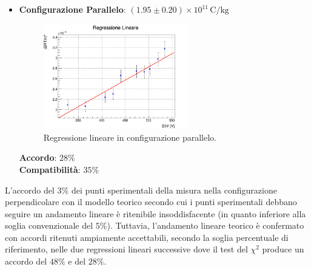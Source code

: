 \documentclass[a4paper,12pt]{article}
\begin{document}
\begin{itemize}
    \item \textbf{Configurazione Parallelo}: \( (1.95 \pm 0.20) \times 10^{11} \, \text{C/kg}\)
    \begin{figure}[H]
        \centering
        \includegraphics[width=0.6\textwidth]{regr_parallelo.png}
        \caption{Regressione lineare in configurazione parallelo.}
        \label{fig:regr_parallelo}
    \end{figure}
    \textbf{Accordo}: \(28\%\) \\
    \textbf{Compatibilità}: \(35\%\)
\end{itemize}
L’accordo del \(3\%\) dei punti sperimentali della misura nella configurazione perpendicolare con il modello teorico secondo cui i punti sperimentali debbano seguire un andamento lineare è ritenibile insoddisfacente (in quanto inferiore alla soglia convenzionale del \(5\%\)). Tuttavia, l’andamento lineare teorico è confermato con accordi ritenuti ampiamente accettabili, secondo la soglia percentuale di riferimento, nelle due regressioni lineari successive dove il test del \( \chi^2 \) produce un accordo del \(48\%\) e del \(28\%\).

\end{document}
